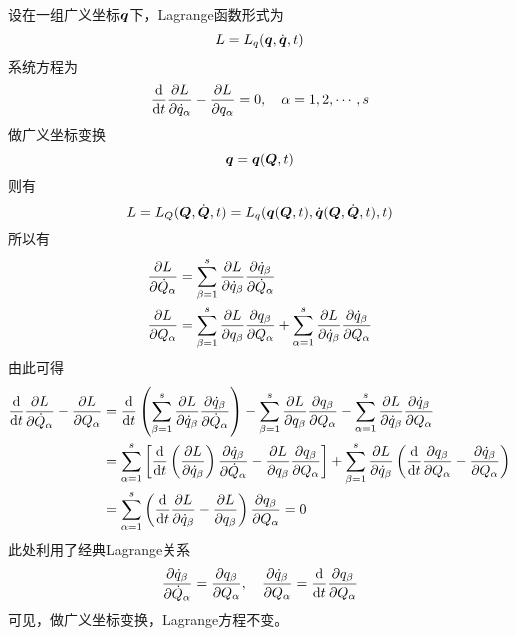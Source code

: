 设在一组广义坐标$\boldsymbol{q}$下，Lagrange函数形式为
\begin{equation*}
	L = L_q(\boldsymbol{q},\dot{\boldsymbol{q}},t)
\end{equation*}
系统方程为
\begin{equation*}
	\frac{\mathrm{d}}{\mathrm{d} t} \frac{\partial L}{\partial \dot{q}_\alpha} - \frac{\partial L}{\partial q_\alpha} = 0,\quad \alpha = 1,2,\cdots,s
\end{equation*}
做广义坐标变换
\begin{equation*}
	\boldsymbol{q} = \boldsymbol{q}(\boldsymbol{Q},t)
\end{equation*}
则有
\begin{equation*}
	L = L_Q(\boldsymbol{Q},\dot{\boldsymbol{Q}},t) = L_q(\boldsymbol{q}(\boldsymbol{Q},t),\dot{\boldsymbol{q}}(\boldsymbol{Q},\dot{\boldsymbol{Q}},t),t)
\end{equation*}
所以有
\begin{align*}
	\frac{\partial L}{\partial \dot{Q}_\alpha} & = \sum_{\beta=1}^s \frac{\partial L}{\partial \dot{q}_\beta} \frac{\partial \dot{q}_\beta}{\partial \dot{Q}_\alpha} \\
	\frac{\partial L}{\partial Q_\alpha} & = \sum_{\beta=1}^s \frac{\partial L}{\partial q_\beta} \frac{\partial q_\beta}{\partial Q_\alpha} + \sum_{\alpha=1}^s \frac{\partial L}{\partial \dot{q}_\beta} \frac{\partial \dot{q}_\beta}{\partial Q_\alpha} 
\end{align*}
由此可得
\begin{align*}
	\frac{\mathrm{d}}{\mathrm{d} t} \frac{\partial L}{\partial \dot{Q}_\alpha} - \frac{\partial L}{\partial Q_\alpha} & = \frac{\mathrm{d}}{\mathrm{d} t} \left(\sum_{\beta=1}^s \frac{\partial L}{\partial \dot{q}_\beta} \frac{\partial \dot{q}_\beta}{\partial \dot{Q}_\alpha}\right) - \sum_{\beta=1}^s \frac{\partial L}{\partial q_\beta} \frac{\partial q_\beta}{\partial Q_\alpha} - \sum_{\alpha=1}^s \frac{\partial L}{\partial \dot{q}_\beta} \frac{\partial \dot{q}_\beta}{\partial Q_\alpha} \\
	& = \sum_{\alpha=1}^s \left[\frac{\mathrm{d}}{\mathrm{d} t} \left(\frac{\partial L}{\partial \dot{q}_\beta}\right) \frac{\partial \dot{q}_\beta}{\partial \dot{Q}_\alpha} - \frac{\partial L}{\partial q_\beta} \frac{\partial q_\beta}{\partial Q_\alpha}\right] + \sum_{\beta=1}^s \frac{\partial L}{\partial \dot{q}_\beta} \left(\frac{\mathrm{d}}{\mathrm{d} t} \frac{\partial q_\beta}{\partial Q_\alpha} - \frac{\partial \dot{q}_\beta}{\partial Q_\alpha}\right) \\
	& = \sum_{\alpha=1}^s \left(\frac{\mathrm{d}}{\mathrm{d} t} \frac{\partial L}{\partial \dot{q}_\beta} - \frac{\partial L}{\partial q_\beta}\right) \frac{\partial q_\beta}{\partial Q_\alpha} = 0
\end{align*}
此处利用了经典Lagrange关系
\begin{equation*}
	\frac{\partial \dot{q}_\beta}{\partial \dot{Q}_\alpha} = \frac{\partial q_\beta}{\partial Q_\alpha},\quad \frac{\partial \dot{q}_\beta}{\partial Q_\alpha} = \frac{\mathrm{d}}{\mathrm{d} t} \frac{\partial q_\beta}{\partial Q_\alpha}
\end{equation*}
可见，做广义坐标变换，Lagrange方程不变。

